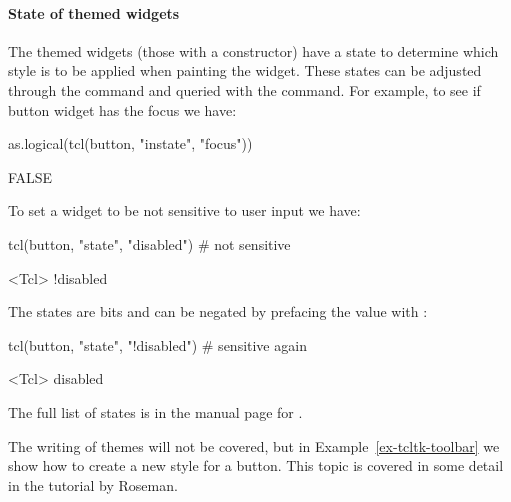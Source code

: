 \paragraph{State of themed widgets}

The themed widgets (those with a  constructor) have a state
to determine which style is to be applied when painting the
widget. These states can be adjusted through the  command
and queried with the  command. For example, to see if
button widget  has the focus we have:
\begin{Schunk}
\begin{Sinput}
 as.logical(tcl(button, "instate", "focus"))
\end{Sinput}
\begin{Soutput}
[1] FALSE
\end{Soutput}
\end{Schunk}
To set a widget to be not sensitive to user input we have:
\begin{Schunk}
\begin{Sinput}
 tcl(button, "state", "disabled")             # not sensitive
\end{Sinput}
\begin{Soutput}
<Tcl> !disabled 
\end{Soutput}
\end{Schunk}
The states are bits and can be negated by prefacing the value with \code{!}:
\begin{Schunk}
\begin{Sinput}
 tcl(button, "state", "!disabled")            # sensitive again
\end{Sinput}
\begin{Soutput}
<Tcl> disabled 
\end{Soutput}
\end{Schunk}

The full list of states is in the manual page for .


The writing of themes will not be covered, but in
Example~\ref{ex-tcltk-toolbar} we show how to create a new style for a
button. This topic is covered in some detail in the \Tk\/ tutorial by Roseman.
\\


